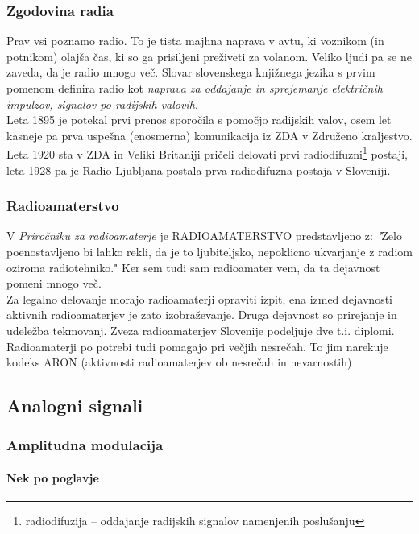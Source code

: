 \documentclass[12pt]{article}
\begin{document}
        \subsubsection{Zgodovina radia}
            Prav vsi poznamo radio. To je tista majhna naprava v avtu, ki voznikom (in potnikom) olajša čas, ki so ga prisiljeni preživeti za volanom. 
            Veliko ljudi pa se ne zaveda, da je radio mnogo več. Slovar slovenskega knjižnega jezika s prvim pomenom definira radio kot \textit{naprava za oddajanje in sprejemanje električnih impulzov, signalov po radijskih valovih}. \cite{SSKJ-radio}\\
            Leta 1895 \cite{ppt} je potekal prvi prenos sporočila s pomočjo radijskih valov, osem let kasneje pa prva uspešna (enosmerna) komunikacija iz ZDA v Združeno kraljestvo. 
            Leta 1920 sta v ZDA in Veliki Britaniji pričeli delovati prvi radiodifuzni\footnote{radiodifuzija – oddajanje radijskih signalov namenjenih poslušanju} postaji, leta 1928 pa je Radio Ljubljana postala prva radiodifuzna postaja v Sloveniji.
        \subsubsection{Radioamaterstvo}
            V \textit{Priročniku za radioamaterje} je RADIOAMATERSTVO predstavljeno z: \textit{"}Zelo poenostavljeno bi lahko rekli, da je to ljubiteljsko, nepoklicno ukvarjanje z radiom oziroma radiotehniko." \cite{HAM-prirocnik}
            Ker sem tudi sam radioamater vem, da ta dejavnost pomeni mnogo več. \\
            Za legalno delovanje morajo radioamaterji opraviti izpit, ena izmed dejavnosti aktivnih radioamaterjev je zato izobraževanje.
            Druga dejavnost so prirejanje in udeležba tekmovanj. Zveza radioamaterjev Slovenije podeljuje dve t.i. diplomi.\\
            Radioamaterji po potrebi tudi pomagajo pri večjih nesrečah. To jim narekuje kodeks ARON (aktivnosti radioamaterjev ob nesrečah in nevarnostih) 
    \subsection{Analogni signali}
        \subsubsection{Amplitudna modulacija}
            \paragraph{Nek po poglavje}
\end{document}
